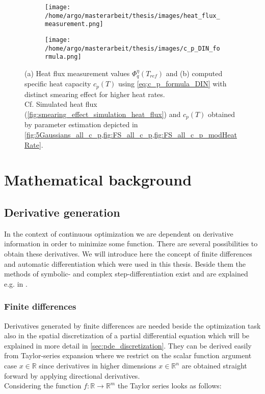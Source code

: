 \documentclass{scrartcl}[12pt, halfparskip]
\numberwithin{equation}{section}
\numberwithin{figure}{section}
\numberwithin{table}{section}
\begin{document}
\begin{figure}[H]
	\centering
	\begin{subfigure}{0.7\textwidth}
		\texttt{[image: /home/argo/masterarbeit/thesis/images/heat\_flux\_measurement.png]}
		\caption{}
		\label{fig:heat_flux_measurements}
	\end{subfigure}
	\begin{subfigure}{0.7\textwidth}
		\texttt{[image: /home/argo/masterarbeit/thesis/images/c\_p\_DIN\_formula.png]}
		\caption{}
		\label{fig:c_p_DIN_formula}
	\end{subfigure}
	\caption{(a) Heat flux measurement values $\varPhi_q^{\eta}(T_{ref})$ and (b) computed specific heat capacity $c_p(T)$ using \cref{eq:c_p_formula_DIN} with distinct smearing effect for higher heat rates. \\
	Cf. Simulated heat flux (\cref{fig:smearing_effect_simulation_heat_flux}) and $c_p(T)$ obtained by parameter estimation depicted in \cref{fig:5Gaussians_all_c_p,fig:FS_all_c_p,fig:FS_all_c_p_modHeatRate}.}
\end{figure}


\newpage
\section{Mathematical background}
\label{sec:mathematical_background}

\subsection{Derivative generation}
In the context of continuous optimization we are dependent on derivative information in order to minimize some function. 
There are several possibilities to obtain these derivatives. We will introduce here the concept of finite differences and automatic differentiation which were used in this thesis. 
Beside them the methods of symbolic- and complex step-differentiation exist and are explained e.g. in \cite{diss_jan}.

\subsubsection{Finite differences}
\label{sec:finite_differences}
Derivatives generated by finite differences are needed beside the optimization task also in the spatial discretization of a partial differential equation which will be explained in more detail in \cref{sec:pde_discretization}.
They can be derived easily from Taylor-series expansion where we restrict on the scalar function argument case $x \in \mathbb{R}$ since derivatives in higher dimensions $x \in \mathbb{R}^n$ are obtained straight forward by applying directional derivatives. \\
Considering the function $f: \mathbb{R} \rightarrow \mathbb{R}^m$ the Taylor series looks as follows:
\end{document}
